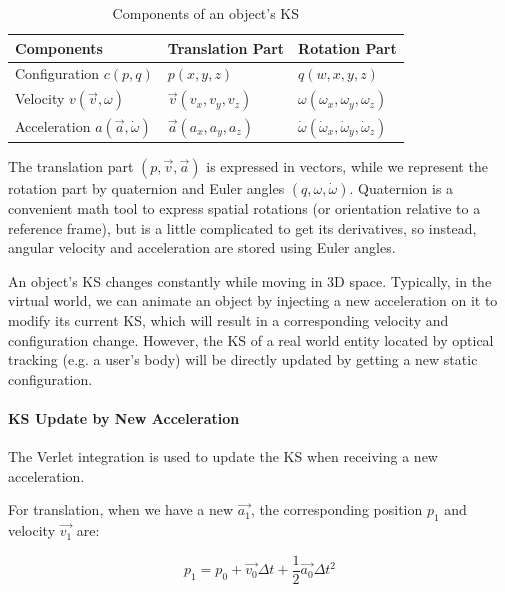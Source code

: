\begin{table}[hbt]
\renewcommand{\arraystretch}{1.3}
\caption{Components of an object's KS}
\label{tab:5_ks_components}
\centering
\begin{tabular}{l l l}
  \hline
  Components & Translation Part & Rotation Part \\
  \hline
  Configuration $c(p, q)$ & $p(x, y, z)$ & $q(w, x, y, z)$ \\
  Velocity $v(\overrightarrow{v}, \omega)$ & $\overrightarrow{v}(v_{x}, v_{y}, v_{z})$ & $\omega(\omega_{x},\omega_{y},\omega_{z})$ \\
  Acceleration $a(\overrightarrow{a}, \dot{\omega})$ & $\overrightarrow{a}(a_{x}, a_{y}, a_{z})$ & $\dot{\omega}(\dot{\omega}_{x},\dot{\omega}_{y},\dot{\omega}_{z})$ \\
  \hline
\end{tabular}
\end{table}

The translation part $(p,\overrightarrow{v},\overrightarrow{a})$ is expressed in vectors, while we represent the rotation part by quaternion and Euler angles $(q,\omega,\dot{\omega})$. Quaternion is a convenient math tool to express spatial rotations (or orientation relative to a reference frame), but is a little complicated to get its derivatives, so instead, angular velocity and acceleration are stored using Euler angles.

An object's KS changes constantly while moving in 3D space. Typically, in the virtual world, we can animate an object by injecting a new acceleration on it to modify its current KS, which will result in a corresponding velocity and configuration change. However, the KS of a real world entity located by optical tracking (e.g. a user's body) will be directly updated by getting a new static configuration.


\paragraph{KS Update by New Acceleration}
The Verlet integration is used to update the KS when receiving a new acceleration.

For translation, when we have a new $\overrightarrow{a_{1}}$, the corresponding position $p_{1}$ and velocity $\overrightarrow{v_{1}}$ are:

\begin{equation}
p_{1}=p_{0}+\overrightarrow{v_{0}}\Delta t+\frac{1}{2}\overrightarrow{a_{0}}\Delta t^{2}
\end{equation}

